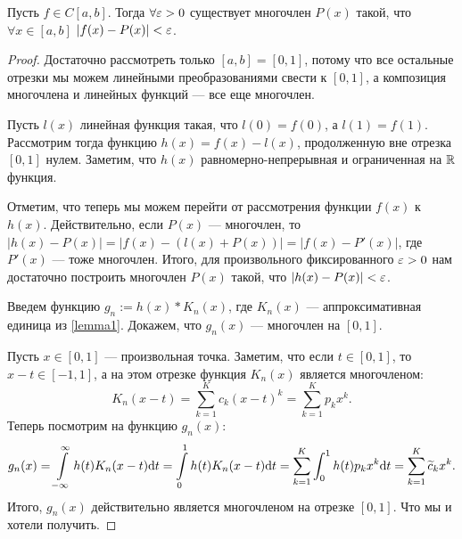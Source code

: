 \begin{Theorem}
Пусть $f \in C[a, b]$. Тогда $\forall \varepsilon > 0$ существует многочлен $P(x)$ такой, что \\$\forall x \in [a, b]$ $|f(x) - P(x)| < \varepsilon$. 
\end{Theorem}
\begin{proof}
Достаточно рассмотреть только $[a, b] = [0, 1]$, потому что все остальные отрезки мы можем линейными преобразованиями свести к $[0, 1]$, а композиция многочлена и линейных функций --- все еще многочлен.

Пусть $l(x)$ линейная функция такая, что $l(0) = f(0)$, а $l(1) = f(1)$. Рассмотрим тогда функцию $h(x) = f(x) - l(x)$, продолженную вне отрезка $[0, 1]$ нулем. Заметим, что $h(x)$ равномерно-непрерывная и ограниченная на $\mathbb{R}$ функция.

Отметим, что теперь мы можем перейти от рассмотрения функции $f(x)$ к $h(x)$. Действительно, если $P(x)$ --- многочлен, то $|h(x) - P(x)| = |f(x) - (l(x) + P(x))| = |f(x) - P'(x)|$, где $P'(x)$ --- тоже многочлен. Итого, для произвольного фиксированного $\varepsilon > 0$ нам достаточно построить многочлен $P(x)$ такой, что $|h(x) - P(x)| < \varepsilon$.

Введем функцию $g_n := h(x) * K_n(x)$, где $K_n(x)$ --- аппроксимативная единица из \ref{lemma1}. Докажем, что $g_n(x)$ --- многочлен на $[0, 1]$. 

Пусть $x \in [0, 1]$ --- произвольная точка. Заметим, что если $t \in [0, 1]$, то $x - t \in [-1, 1]$, а на этом отрезке функция $K_n(x)$ является многочленом: 
$$
K_n(x - t) = \sum\limits_{k = 1}^{K}c_k(x - t)^k = \sum\limits_{k = 1}^K p_kx^k.
$$
Теперь посмотрим на функцию $g_n(x)$:
$$
g_n(x) = \int\limits_{-\infty}^{\infty}h(t)K_n(x - t)\mathrm{d} t = \int\limits_{0}^1h(t)K_n(x - t)\mathrm{d} t = \sum\limits_{k = 1}^K \int_0^1 h(t)p_k x^k \mathrm{d} t = \sum\limits_{k = 1}^K \widetilde{c}_k x^k.
$$
Итого, $g_n(x)$ действительно является многочленом на отрезке $[0, 1]$. Что мы и хотели получить.
\end{proof}


